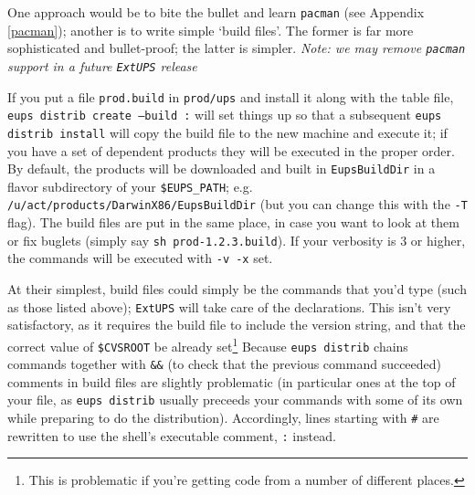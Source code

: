 \documentclass{article}
\newcommand{\code}[1]{\texttt{#1}}
\newcommand{\eups}{\code{ExtUPS}}
\newcommand{\pacman}{\code{pacman}}
\begin{document}
One approach would be to bite the bullet and learn \pacman{} (see Appendix \ref{pacman});
another is to write simple `build files'.  The former is far more sophisticated
and bullet-proof; the latter is simpler.
\textit{Note: we may remove \pacman{} support in a future \eups{} release}

If you put a file \code{prod.build} in \code{prod/ups} and install it along
with the table file, \code{eups distrib create --build :} will set things up
so that a subsequent \code{eups distrib install} will copy the build file
to the new machine and execute it;  if you have a set of dependent products
they will be executed in the proper order.  By default, the products will be downloaded
and built in \code{EupsBuildDir} in a flavor subdirectory of your \code{\$EUPS\_PATH};
e.g. \code{/u/act/products/DarwinX86/EupsBuildDir} (but you can change this with
the \code{-T} flag). The build files are put in the same place, in case you want
to look at them or fix buglets (simply say \code{sh prod-1.2.3.build}).  If your
verbosity is 3 or higher, the commands will be executed with \code{-v -x} set.

At their simplest, build files could simply
be the commands that you'd type (such as those listed above); \eups{} will take
care of the declarations.  This isn't very satisfactory, as it requires the
build file to include the version string, and that the correct value of \code{\$CVSROOT}
be already set\footnote{This is problematic if you're getting code from a number
  of different places.}
Because \code{eups distrib} chains commands together with \code{\&\&} (to check
that the previous command succeeded) comments in build files are slightly
problematic (in particular ones at the top of your file, as \code{eups distrib}
usually preceeds your commands with some of its own while preparing to do
the distribution).  Accordingly, lines starting with \code{\#} are rewritten
to use the shell's executable comment, \code{:} instead.
\end{document}
